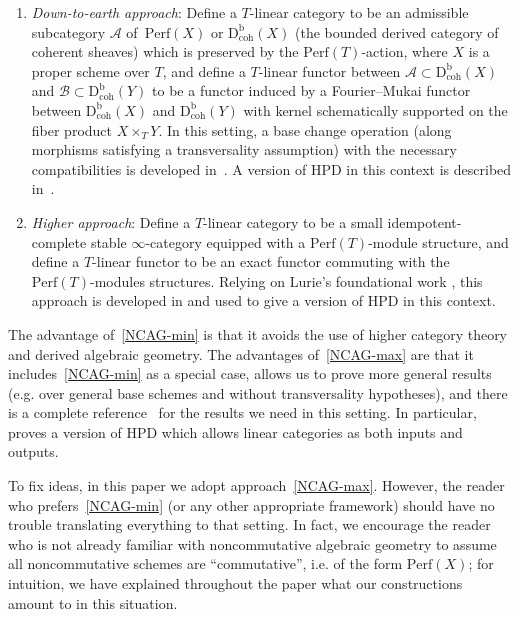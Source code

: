 \documentclass[11pt, reqno]{amsart}
\numberwithin{equation}{section}
\theoremstyle{plain}
\theoremstyle{definition}
\newcommand{\Perf}{\mathrm{Perf}}
\newcommand{\Db}{\mathrm{D^b_{coh}}}
\newcommand{\cA}{\mathcal{A}}
\newcommand{\cB}{\mathcal{B}}
\begin{document}
\begin{enumerate}
\item 
\label{NCAG-min}
\emph{Down-to-earth approach}:
Define a $T$-linear category to be an admissible subcategory $\cA$ of~$\Perf(X)$ or $\Db(X)$ 
(the bounded derived category of coherent sheaves)
which is preserved by the $\Perf(T)$-action, where $X$ is a proper scheme over $T$,  
and define a $T$-linear functor between $\cA \subset \Db(X)$ and $\cB \subset \Db(Y)$ 
to be a functor induced by a Fourier--Mukai functor between $\Db(X)$ and $\Db(Y)$ 
with kernel schematically supported on the fiber product $X \times_T Y$. 
In this setting, a base change operation (along morphisms satisfying a transversality assumption) with 
the necessary compatibilities is developed in~\cite{kuznetsov-base-change}.
A version of HPD in this context is described in~\cite{kuznetsov-hab}. 

\item 
\label{NCAG-max}
\emph{Higher approach}:
Define a $T$-linear category to be a small idempotent-complete stable $\infty$-category 
equipped with a $\Perf(T)$-module structure, 
and define a $T$-linear functor to be an exact functor commuting with the $\Perf(T)$-modules structures.
Relying on Lurie's foundational work \cite{lurie-HA}, this approach is developed in \cite{NCHPD} 
and used to give a version of HPD in this context. 
\end{enumerate}

The advantage of~\eqref{NCAG-min} is that it avoids the use of higher 
category theory and derived algebraic geometry. 
The advantages of~\eqref{NCAG-max} are that it includes~\eqref{NCAG-min} 
as a special case, allows us to prove more general results (e.g. over general 
base schemes and without transversality hypotheses), and there is a complete 
reference~\cite{NCHPD} for the results we need in this setting. 
In particular, \cite{NCHPD} proves a version of HPD which allows linear categories 
as both inputs and outputs. 

To fix ideas, in this paper we adopt approach~\eqref{NCAG-max}.  
However, the reader who prefers~\eqref{NCAG-min} (or any other appropriate framework)
should have no trouble translating everything to that setting. 
In fact, we encourage the reader who is not already familiar with noncommutative 
algebraic geometry to assume all noncommutative schemes are ``commutative'', 
i.e. of the form $\Perf(X)$; for intuition, we have explained throughout the paper 
what our constructions amount to in this situation. 
\end{document}
